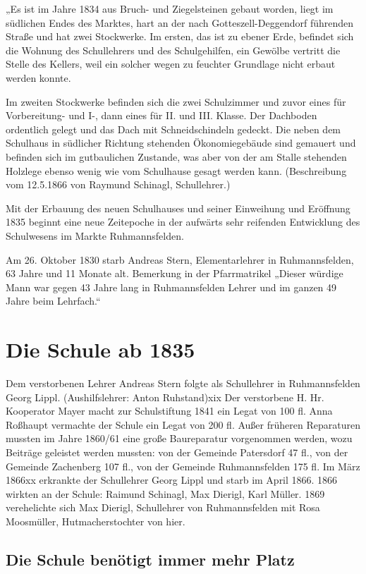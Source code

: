 \documentclass[12pt,a4paper]{book}
\begin{document}
„Es ist im Jahre 1834 aus Bruch- und Ziegelsteinen gebaut worden, liegt im
südlichen Endes des Marktes, hart an der nach Gotteszell-Deggendorf führenden
Straße und hat zwei Stockwerke. Im ersten, das ist zu ebener Erde, befindet sich
die Wohnung des Schullehrers und des Schulgehilfen, ein Gewölbe vertritt die
Stelle des Kellers, weil ein solcher wegen zu feuchter Grundlage nicht erbaut
werden konnte.

Im zweiten Stockwerke befinden sich die zwei Schulzimmer und zuvor eines für
Vorbereitung- und I-, dann eines für II. und III. Klasse. Der Dachboden
ordentlich gelegt und das Dach mit Schneidschindeln gedeckt. Die neben dem
Schulhaus in südlicher Richtung stehenden Ökonomiegebäude sind gemauert und
befinden sich im gutbaulichen Zustande, was aber von der am Stalle stehenden
Holzlege ebenso wenig wie vom Schulhause gesagt werden kann. (Beschreibung vom
12.5.1866 von Raymund Schinagl, Schullehrer.)

Mit der Erbauung des neuen Schulhauses und seiner Einweihung und Eröffnung 1835
beginnt eine neue Zeitepoche in der aufwärts sehr reifenden Entwicklung des
Schulwesens im Markte Ruhmannsfelden.

Am 26. Oktober 1830 starb Andreas Stern, Elementarlehrer in Ruhmannsfelden, 63
Jahre und 11 Monate alt. Bemerkung in der Pfarrmatrikel „Dieser würdige Mann war
gegen 43 Jahre lang in Ruhmannsfelden Lehrer und im ganzen 49 Jahre beim
Lehrfach.“

\chapter{Die Schule ab 1835}

Dem verstorbenen Lehrer Andreas Stern folgte als Schullehrer in Ruhmannsfelden
Georg Lippl. (Aushilfslehrer: Anton Ruhstand)xix Der verstorbene H. Hr.
Kooperator Mayer macht zur Schulstiftung 1841 ein Legat von 100 fl. Anna
Roßhaupt vermachte der Schule ein Legat von 200 fl. Außer früheren Reparaturen
mussten im Jahre 1860/61 eine große Baureparatur vorgenommen werden, wozu
Beiträge geleistet werden mussten: von der Gemeinde Patersdorf 47 fl., von der
Gemeinde Zachenberg 107 fl., von der Gemeinde Ruhmannsfelden 175 fl. Im März
1866xx erkrankte der Schullehrer Georg Lippl und starb im April 1866. 1866
wirkten an der Schule: Raimund Schinagl, Max Dierigl, Karl Müller. 1869
verehelichte sich Max Dierigl, Schullehrer von Ruhmannsfelden mit Rosa
Moosmüller, Hutmacherstochter von hier.

\section{Die Schule benötigt immer mehr Platz}
\end{document}
